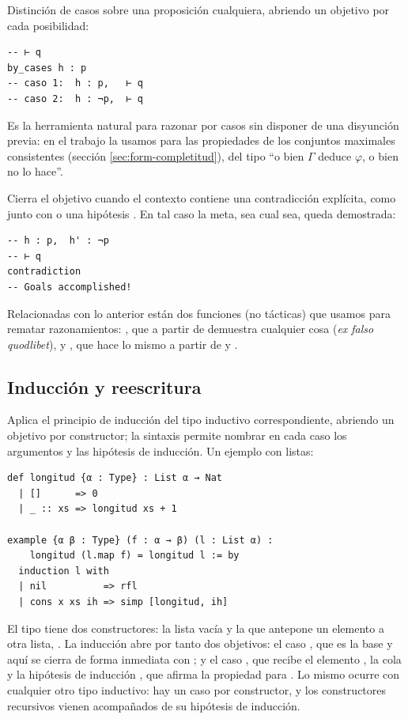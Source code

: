  Distinción de casos sobre una proposición cualquiera, abriendo un objetivo por cada posibilidad:

\begin{lstlisting}
-- ⊢ q
by_cases h : p
-- caso 1:  h : p,   ⊢ q
-- caso 2:  h : ¬p,  ⊢ q
\end{lstlisting}

Es la herramienta natural para razonar por casos sin disponer de una disyunción previa: en el trabajo la usamos para las propiedades de los conjuntos maximales consistentes (sección \ref{sec:form-completitud}), del tipo ``o bien $\Gamma$ deduce $\varphi$, o bien no lo hace''.

 Cierra el objetivo cuando el contexto contiene una contradicción explícita, como  junto con  o una hipótesis . En tal caso la meta, sea cual sea, queda demostrada:

\begin{lstlisting}
-- h : p,  h' : ¬p
-- ⊢ q
contradiction
-- Goals accomplished!
\end{lstlisting}

Relacionadas con lo anterior están dos funciones (no tácticas) que usamos para rematar razonamientos: , que a partir de  demuestra cualquier cosa (\emph{ex falso quodlibet}), y , que hace lo mismo a partir de  y .

\subsection{Inducción y reescritura}

 Aplica el principio de inducción del tipo inductivo correspondiente, abriendo un objetivo por constructor; la sintaxis  permite nombrar en cada caso los argumentos y las hipótesis de inducción. Un ejemplo con listas:

\begin{lstlisting}
def longitud {α : Type} : List α → Nat
  | []      => 0
  | _ :: xs => longitud xs + 1

example {α β : Type} (f : α → β) (l : List α) :
    longitud (l.map f) = longitud l := by
  induction l with
  | nil          => rfl
  | cons x xs ih => simp [longitud, ih]
\end{lstlisting}

El tipo  tiene dos constructores: la lista vacía \lean{[]} y la que antepone un elemento a otra lista, . La inducción abre por tanto dos objetivos: el caso , que es la base y aquí se cierra de forma inmediata con ; y el caso , que recibe el elemento , la cola  y la hipótesis de inducción , que afirma la propiedad para . Lo mismo ocurre con cualquier otro tipo inductivo: hay un caso por constructor, y los constructores recursivos vienen acompañados de su hipótesis de inducción.

